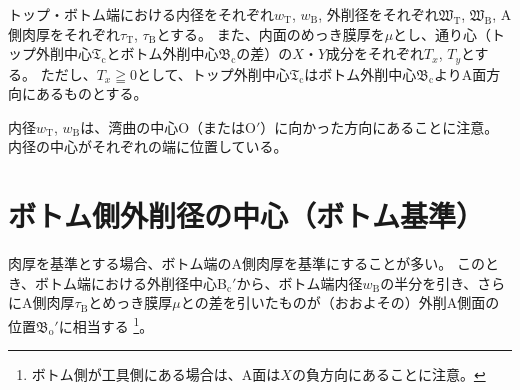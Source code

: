 トップ・ボトム端における内径をそれぞれ$w_\mathrm T$, $w_\mathrm B$, 外削径をそれぞれ$\mathfrak W_\mathrm T$, $\mathfrak W_\mathrm B$, A側肉厚をそれぞれ$\tau_\mathrm T$, $\tau_\mathrm B$とする。
また、内面のめっき膜厚を$\mu$とし、通り心（トップ外削中心$\mathfrak T_\mathrm c$とボトム外削中心$\mathfrak B_\mathrm c$の差）の$X$・$Y$成分をそれぞれ$T_x$, $T_y$とする。
ただし、$T_x \geqq 0$として、トップ外削中心$\mathfrak T_\mathrm c$はボトム外削中心$\mathfrak B_\mathrm c$よりA面方向にあるものとする。
\begin{hosoku}
内径$w_\mathrm T$, $w_\mathrm B$は、湾曲の中心O（またはO$'$）に向かった方向にあることに注意。
内径の中心がそれぞれの端に位置している。
\end{hosoku}



\section{ボトム側外削径の中心（ボトム基準）}
肉厚を基準とする場合、ボトム端のA側肉厚を基準にすることが多い。
このとき、ボトム端における外削径中心B$_\mathrm c'$から、ボトム端内径$w_\mathrm B$の半分を引き、さらにA側肉厚$\tau_\mathrm B$とめっき膜厚$\mu$との差を引いたものが（おおよその）外削A側面の位置$\mathfrak B_\mathrm o'$に相当する
\footnote{ボトム側が工具側にある場合は、A面は$X$の負方向にあることに注意。}。


